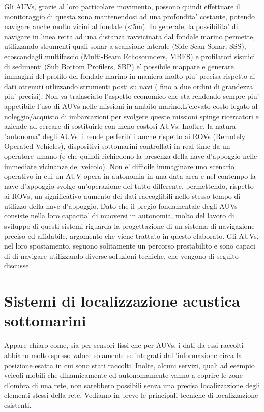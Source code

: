 Gli AUVs, grazie al loro particolare movimento, possono quindi effettuare il monitoraggio di questa zona mantenendosi ad una profondita' costante, potendo navigare anche molto vicini al fondale (<5m). \newline
In generale, la possibilita' di navigare in linea retta ad una distanza ravvicinata dal fondale marino permette, utilizzando strumenti quali sonar a scansione laterale (Side Scan Sonar, SSS), ecoscandagli multifascio (Multi-Beam Echosounders, MBES) e profilatori sismici di sedimenti (Sub Bottom Profilers, SBP) e' possibile mappare e generare immagini del profilo del fondale marino in maniera molto piu' precisa rispetto ai dati ottenuti utlizzando strumenti posti su navi ( fino a due ordini di grandezza piu' precisi). \newline 
Non va tralasciato l'aspetto economico che sta rendendo sempre piu' appetibile l'uso di AUVs nelle missioni in ambito marino.\newline L'elevato costo legato al noleggio/acquisto di imbarcazioni per svolgere queste missioni spinge ricercatori e aziende ad cercare di sostituirle con meno costosi AUVs. \newline Inoltre, la natura "autonoma" degli AUVs li rende perferibili anche rispetto ai ROVs (Remotely Operated Vehicles), dispositivi sottomarini controllati in real-time da un operatore umano (e che quindi richiedono la presenza della nave d'appoggio nelle immediate vicinanze del veicolo). \newline Non e' difficile immaginare uno scenario operativo in cui un AUV opera in autonomia in una data area e nel contempo la nave d'appoggio svolge un'operazione del tutto differente, permettendo, rispetto ai ROVs, un significativo aumento dei dati raccoglibili nello stesso tempo di utilizzo della nave d'appoggio. \newline
Dato che il pregio fondamentale degli AUVs consiste nella loro capacita' di muoversi in autonomia, molto del lavoro di sviluppo di questi sistemi riguarda la progettazione di un sistema di navigazione preciso ed affidabile, argomento che viene trattato in questo elaborato. \newline
Gli AUVs, nel loro spostamento, seguono solitamente un percorso prestabilito e sono capaci di di navigare utilizzando diverse soluzioni tecniche, che vengono di seguito discusse.


\section{Sistemi di localizzazione acustica sottomarini}
Appare chiaro come, sia per sensori fissi che per AUVs, i dati da essi raccolti abbiano molto spesso valore solamente se integrati dall'informazione circa la posizione esatta in cui sono stati raccolti. Inolte, alcuni servizi, quali ad esempio veicoli mobili che dinamicamente ed autonomamente vanno a coprire le zone d'ombra di una rete, non sarebbero possibili senza una precisa localizzazione degli elementi stessi della rete.
Vediamo in breve le principali tecniche di localizzazione esistenti.

